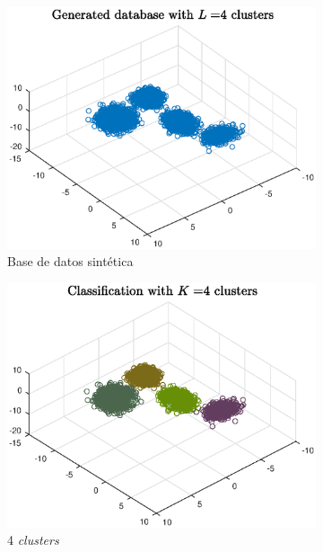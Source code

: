 \documentclass[11pt]{article} %
\begin{document}
\begin{figure}%
    \centering
    \begin{subfigure}[b]{0.3\textwidth}
        \includegraphics[width=\textwidth]{../src/fig/21_database.eps}
        \caption[]{Base de datos sintética}
        \label{fig:21:db}
    \end{subfigure}
    \quad
    \begin{subfigure}[b]{0.3\textwidth}
        \includegraphics[width=\textwidth]{../src/fig/21_4_clusters.eps}
        \caption[]{4 \emph{clusters}}
        \label{fig:21:4c}
    \end{subfigure}
    \quad
    \begin{subfigure}[b]{0.3\textwidth}

\end{subfigure}
\end{figure}
\end{document}
